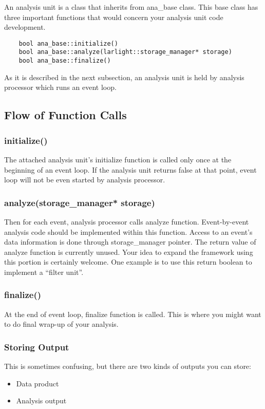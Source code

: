
An analysis unit is a \CPP class that inherits from {\ttfamily ana\_base} class. 
This base class has three important functions that would concern your analysis unit code development.
\begin{lstlisting}
    bool ana_base::initialize()
    bool ana_base::analyze(larlight::storage_manager* storage)
    bool ana_base::finalize()
\end{lstlisting}
As it is described in the next subsection, an analysis unit is held by analysis processor which runs an event loop.

\subsection{Flow of Function Calls}

\subsubsection{{\ttfamily initialize()}}
The attached analysis unit's {\ttfamily initialize} function is called only once at the beginning of an event loop. 
If the analysis unit returns {\ttfamily false} at that point, event loop will not be even started by analysis processor.

\subsubsection{{\ttfamily analyze(storage\_manager* storage)}}
Then for each event, analysis processor calls {\ttfamily analyze} function. Event-by-event analysis code should be implemented within this function. Access to an event's data information is done through {\ttfamily storage\_manager} pointer. The return value of {\ttfamily analyze} function is currently unused. Your idea to expand the framework using this portion is certainly welcome. One example is to use this return boolean to implement a ``filter unit''.

\subsubsection{{\ttfamily finalize()}}
At the end of event loop, {\ttfamily finalize} function is called. This is where you might want to do final wrap-up of your analysis.

\subsubsection{Storing Output}
This is sometimes confusing, but there are two kinds of outputs you can store:
\begin{itemize}
\item Data product
\item Analysis output
\end{itemize}

